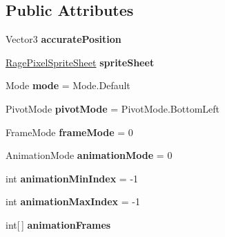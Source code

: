 \subsection*{Public Attributes}
\begin{DoxyCompactItemize}
\item 
\hypertarget{class_rage_pixel_sprite_ab1361e86e94e2b50037db46da41070c3}{Vector3 {\bfseries accurate\-Position}}\label{class_rage_pixel_sprite_ab1361e86e94e2b50037db46da41070c3}

\item 
\hypertarget{class_rage_pixel_sprite_a4b40d18f2b3f8d91f226a930d389198b}{\hyperlink{class_rage_pixel_sprite_sheet}{Rage\-Pixel\-Sprite\-Sheet} {\bfseries sprite\-Sheet}}\label{class_rage_pixel_sprite_a4b40d18f2b3f8d91f226a930d389198b}

\item 
\hypertarget{class_rage_pixel_sprite_a456f5c61113e978a23ee21ef4d0c1147}{Mode {\bfseries mode} = Mode.\-Default}\label{class_rage_pixel_sprite_a456f5c61113e978a23ee21ef4d0c1147}

\item 
\hypertarget{class_rage_pixel_sprite_a9512abd7d61b396deb721588352d8ee5}{Pivot\-Mode {\bfseries pivot\-Mode} = Pivot\-Mode.\-Bottom\-Left}\label{class_rage_pixel_sprite_a9512abd7d61b396deb721588352d8ee5}

\item 
\hypertarget{class_rage_pixel_sprite_a8ee328d09e16a05f248e534ce48f1b3f}{Frame\-Mode {\bfseries frame\-Mode} = 0}\label{class_rage_pixel_sprite_a8ee328d09e16a05f248e534ce48f1b3f}

\item 
\hypertarget{class_rage_pixel_sprite_a00714fbbb9420558f08fd509b6e4cca0}{Animation\-Mode {\bfseries animation\-Mode} = 0}\label{class_rage_pixel_sprite_a00714fbbb9420558f08fd509b6e4cca0}

\item 
\hypertarget{class_rage_pixel_sprite_ab096e6c7a8822c934326d8393021936c}{int {\bfseries animation\-Min\-Index} = -\/1}\label{class_rage_pixel_sprite_ab096e6c7a8822c934326d8393021936c}

\item 
\hypertarget{class_rage_pixel_sprite_a4497ca1de404d818ab6f3b7c9eb41534}{int {\bfseries animation\-Max\-Index} = -\/1}\label{class_rage_pixel_sprite_a4497ca1de404d818ab6f3b7c9eb41534}

\item 
\hypertarget{class_rage_pixel_sprite_a9da2483664103a922cd39edefbbf8b2a}{int\mbox{[}$\,$\mbox{]} {\bfseries animation\-Frames}}\label{class_rage_pixel_sprite_a9da2483664103a922cd39edefbbf8b2a}


\end{DoxyCompactItemize}

